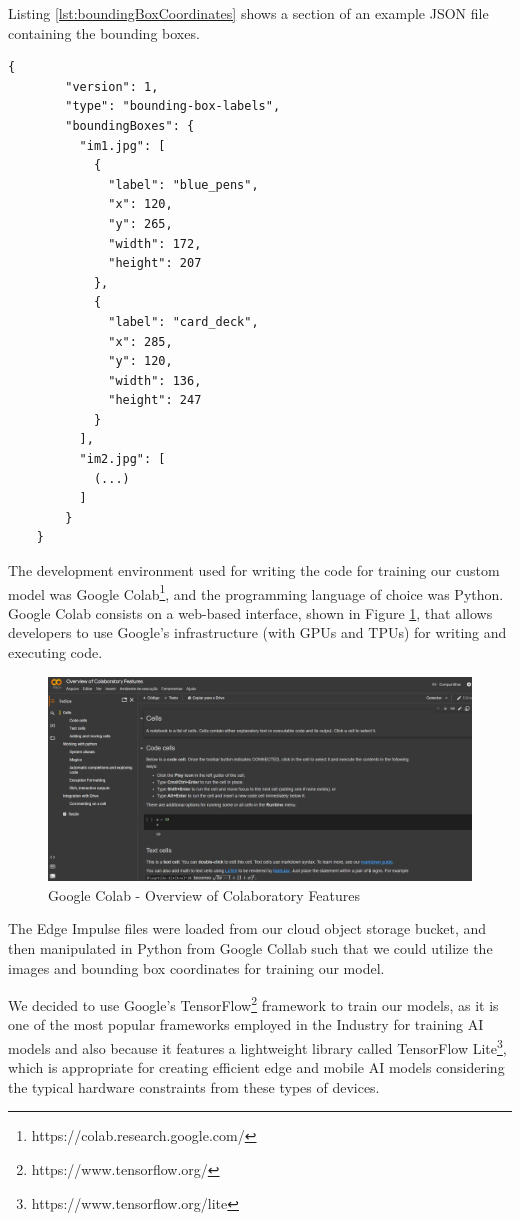 \documentclass[openright]{normas-utf-tex} %
\begin{document}
Listing \ref{lst:boundingBoxCoordinates} shows a section of an example JSON file containing
the bounding boxes.

\begin{lstlisting}[caption={Bounding boxes coordinates file exported from Edge Impulse},label={lst:boundingBoxCoordinates}]
	{
		"version": 1,
		"type": "bounding-box-labels",
		"boundingBoxes": {
		  "im1.jpg": [
			{
			  "label": "blue_pens",
			  "x": 120,
			  "y": 265,
			  "width": 172,
			  "height": 207
			},
			{
			  "label": "card_deck",
			  "x": 285,
			  "y": 120,
			  "width": 136,
			  "height": 247
			}
		  ],
		  "im2.jpg": [
			(...)
		  ]
		}
	}
\end{lstlisting}

The development environment used for writing the code for training our custom
model was Google Colab\footnote{https://colab.research.google.com/}, and the
programming language of choice was Python. Google Colab consists on a web-based
interface, shown in Figure \ref{fig:googlecollab}, that allows developers to
use Google's infrastructure (with GPUs and TPUs) for writing and executing
code.

\begin{figure}[H]
	\centering
	\includegraphics[width=1\textwidth]{./images/google-colab.png}
	\caption[Google Colab - Overview of Colaboratory Features]{Google Colab - Overview of Colaboratory Features}
    \label{fig:googlecollab}
\end{figure}

The Edge Impulse files were loaded from our cloud object storage bucket, and then manipulated in Python
from Google Collab such that we could utilize the images and bounding box coordinates for training
our model.

We decided to use Google's TensorFlow\footnote{https://www.tensorflow.org/} framework to train our 
models, as it is one of the most popular frameworks employed in the Industry for training AI models
and also because it features a lightweight library called TensorFlow Lite\footnote{https://www.tensorflow.org/lite}, 
which is appropriate for creating efficient edge and mobile AI models considering the 
typical hardware constraints from these types of devices.
\end{document}
